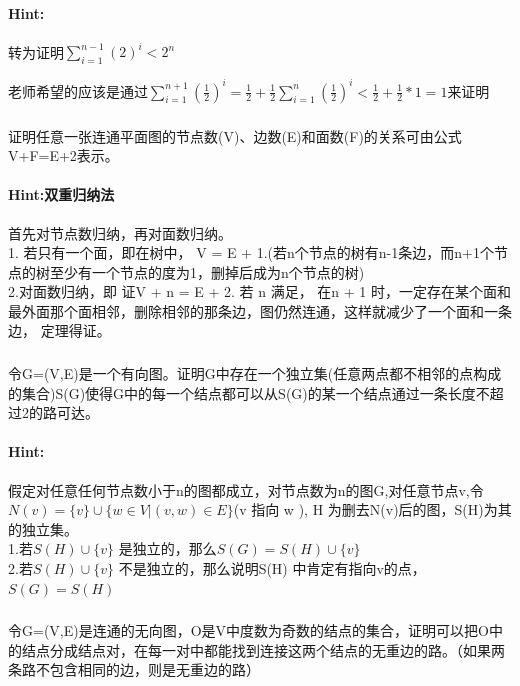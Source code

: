 \documentclass{article}
\begin{document}
     \paragraph{Hint:}转为证明$\sum^{n-1}_{i=1}(2)^{i}< 2^{n}$
     
    老师希望的应该是通过$\sum^{n+1}_{i=1}(\frac{1}{2})^{i} = \frac{1}{2}+\frac{1}{2}\sum^{n}_{i=1}(\frac{1}{2})^{i} < \frac{1}{2} + \frac{1}{2} * 1 = 1$来证明
     
     \subsubsection{}证明任意一张连通平面图的节点数(V)、边数(E)和面数(F)的关系可由公式V+F=E+2表示。
     \paragraph{Hint:双重归纳法}首先对节点数归纳，再对面数归纳。\\
     1. 若只有一个面，即在树中， V = E + 1.(若n个节点的树有n-1条边，而n+1个节点的树至少有一个节点的度为1，删掉后成为n个节点的树)\\
     2.对面数归纳，即 证V + n = E + 2. 若 n 满足， 在n + 1 时，一定存在某个面和最外面那个面相邻，删除相邻的那条边，图仍然连通，这样就减少了一个面和一条边， 定理得证。
     
     \subsubsection{}令G=(V,E)是一个有向图。证明G中存在一个独立集(任意两点都不相邻的点构成的集合)S(G)使得G中的每一个结点都可以从S(G)的某一个结点通过一条长度不超过2的路可达。
     \paragraph{Hint:}假定对任意任何节点数小于n的图都成立，对节点数为n的图G,对任意节点v,令$N(v) = \{v\} \cup \{w\in V| (v,w)\in E\}$(v 指向 w ), H 为删去N(v)后的图，S(H)为其的独立集。\\
     1.若$S(H) \cup \{v\}$ 是独立的，那么$S(G) = S(H) \cup \{v\}$\\
     2.若$S(H) \cup \{v\}$ 不是独立的，那么说明S(H) 中肯定有指向v的点，$S(G) = S(H)$
     
     \subsubsection{}令G=(V,E)是连通的无向图，O是V中度数为奇数的结点的集合，证明可以把O中的结点分成结点对，在每一对中都能找到连接这两个结点的无重边的路。（如果两条路不包含相同的边，则是无重边的路）
\end{document}
